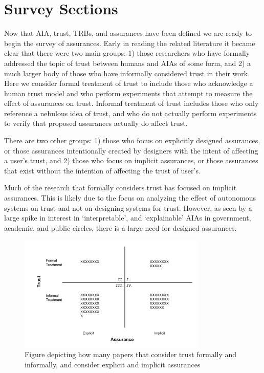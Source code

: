 

\section{Survey Sections} \label{sec:survey}
Now that AIA, trust, TRBs, and assurances have been defined we are ready to begin the survey of assurances. Early in reading the related literature it became clear that there were two main groups: 1) those researchers who have formally addressed the topic of trust between humans and AIAs of some form, and 2) a much larger body of those who have informally considered trust in their work. Here we consider formal treatment of trust to include those who acknowledge a human trust model and who perform experiments that attempt to measure the effect of assurances on trust. Informal treatment of trust includes those who only reference a nebulous idea of trust, and who do not actually perform experiments to verify that proposed assurances actually do affect trust. 

There are two other  groups: 1) those who focus on explicitly designed assurances, or those assurances intentionally created by designers with the intent of affecting a user's trust, and 2) those who focus on implicit assurances, or those assurances that exist without the intention of affecting the trust of user's.

Much of the research that formally considers trust has focused on implicit assurances. This is likely due to the focus on analyzing the effect of autonomous systems on trust and not on designing systems for trust. However, as seen by a large spike in interest in `interpretable', and `explainable' AIAs in government, academic, and public circles, there is a large need for designed assurances.

\begin{figure}[htbp]
    \centering
    \includegraphics[width=0.8\textwidth]{Figures/Trust_vs_Assurance_Intention.pdf}
    \caption{Figure depicting how many papers that consider trust formally and informally, and consider explicit and implicit assurances}
    \label{fig:trust_assurance_intention}
\end{figure}

